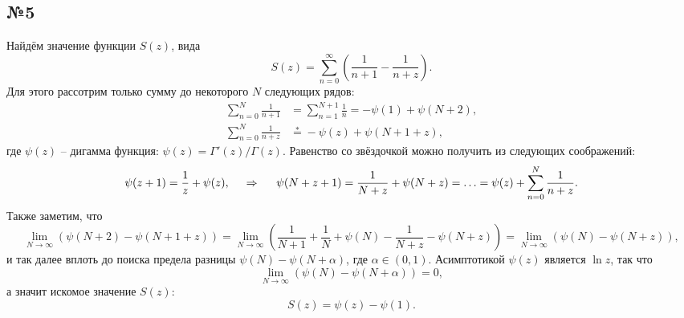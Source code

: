 \subsection*{№5}
Найдём значение функции $S(z)$, вида
\begin{equation*}
    S(z) = \sum_{n=0}^{\infty} \left(\frac{1}{n+1}-\frac{1}{n+z}\right).
\end{equation*}
Для этого рассотрим только сумму до некоторого $N$ следующих рядов:
\begin{align*}
    \sum_{n=0}^{N} \frac{1}{n+1} &= \sum_{n=1}^{N+1} \frac{1}{n} = - \psi(1) + \psi(N+2), \\
    \sum_{n=0}^{N} \frac{1}{n+z} &\overset{*}{=}  - \psi(z) + \psi(N+1+z),
\end{align*}
где $\psi(z)$ -- дигамма функция: $\psi(z) = \Gamma'(z)/\Gamma(z)$. Равенство со звёздочкой можно получить из следующих соображений:
\begin{equation*}
    \psi(z+1) = \frac{1}{z} + \psi(z),
    \hspace{0.5cm} \Rightarrow \hspace{0.5cm}
    \psi(N + z + 1) = \frac{1}{N+z} + \psi(N+z) = \ldots = \psi(z) + \sum_{n=0}^{N} \frac{1}{n+z}.
\end{equation*}
Также заметим, что
\begin{equation*}
    \lim_{N \to \infty} \left(
        \psi(N+2) - \psi\left(N+1 +z\right)
    \right) =
     \lim_{N \to \infty} \left(
     \frac{1}{N+1} + \frac{1}{N} + 
            \psi(N) - \frac{1}{N+z} -\psi\left(N +z\right)
        \right) = \lim_{N \to \infty} \left(
            \psi(N) - \psi(N+z)
        \right),
\end{equation*}
и так далее вплоть до поиска предела разницы $\psi(N) - \psi(N+\alpha)$, где $\alpha \in (0, 1)$. Асимптотикой $\psi (z)$ является $\ln z$, так что 
\begin{equation*}
    \lim_{N \to \infty} \left(
        \psi(N) - \psi\left(N+\alpha\right)
    \right) = 0,
\end{equation*}
а значит искомое значение $S(z)$:
\begin{equation*}
    S(z) = \psi(z) - \psi(1).
\end{equation*}





